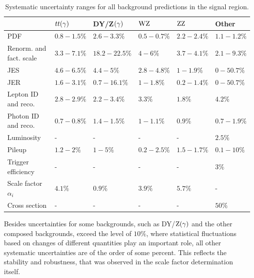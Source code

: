 \begin{table}[tbp]
 \centering
 \caption{Systematic uncertainty ranges for all background predictions in the signal region.}
 \small
 \label{tab:systuncBKG}
 \begin{tabular}[width=\textwidth]{llllll}
                            & $tt(\gamma)$  & DY/Z$(\gamma)$  & $\mathrm{W}\mathrm{Z}$    & $\mathrm{Z}\mathrm{Z}$    & Other       \\\hline
  PDF                       & $0.8-1.5\%$ & $2.6-3.3\%$   & $0.5-0.7\%$ & $2.2-2.4\%$ & $1.1-1.2\%$ \\
  Renorm. and fact. scale   & $3.3-7.1\%$ & $18.2-22.5\%$ & $4-6\%$     & $3.7-4.1\%$ & $2.1-9.3\%$ \\
  JES                       & $4.6-6.5\%$ & $4.4-5\%$     & $2.8-4.8\%$ & $1-1.9\%$   & $0-50.7\%$  \\
  JER                       & $1.6-3.1\%$ & $0.7-16.1\%$  & $1-1.8\%$   & $0.2-1.4\%$ & $0-50.7\%$  \\
  Lepton ID and reco.       & $2.8-2.9\%$ & $2.2-3.4\%$   & $3.3\%$     & $1.8\%$     & $4.2\%$     \\
  Photon ID and reco.       & $0.7-0.8\%$ & $1.4-1.5\%$   & $1-1.1\%$   & $0.9\%$     & $0.7-1.9\%$ \\
  Luminosity                & -           & -             & -           & -           & $2.5\%$     \\
  Pileup                    & $1.2-2\%$   & $1-5\%$       & $0.2-2.5\%$ & $1.5-1.7\%$ & $0.1-10\%$  \\
  Trigger efficiency        & -           & -             & -           & -           & $3\%$       \\
  Scale factor $\alpha_{i}$ & $4.1\%$     & $0.9\%$       & $3.9\%$     & $5.7\%$     & -           \\
  Cross section             & -           & -             & -           & -           & $50\%$      \\
  \hline
 \end{tabular}
\end{table}
Besides uncertainties for some backgrounds, such as DY/$\mathrm{Z}(\gamma)$ and the other composed backgrounds, exceed the level of $10\%$, where statistical fluctuations based on changes of different quantities play an important role, all other systematic uncertainties are of the order of some percent. This reflects the stability and robustness, that was observed in the scale factor determination itself.


